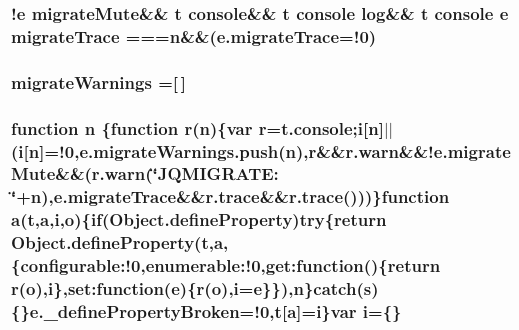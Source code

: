 \subsubsection[{migrate\+Trace}]{ !{\bf e} {\bf migrate\+Mute}\&\& {\bf t} console\&\& {\bf t} console {\bf log}\&\& {\bf t} console {\bf e} migrate\+Trace ==={\bf n}\&\&(e.\+migrate\+Trace=!0)}\label{jquery-migrate-1_82_81_8min_8js_a6965eb7cecccff575d9c9b1a65e4623f}
\hypertarget{jquery-migrate-1_82_81_8min_8js_a0242427f8bf1d2c38898b0e4b81ffb2c}{}
\subsubsection[{migrate\+Warnings}]{ migrate\+Warnings =\mbox{[}$\,$\mbox{]}}\label{jquery-migrate-1_82_81_8min_8js_a0242427f8bf1d2c38898b0e4b81ffb2c}
\hypertarget{jquery-migrate-1_82_81_8min_8js_afc984c4f6c68ce30a0af99006f5f8d27}{}
\subsubsection[{n}]{\setlength{\rightskip}{0pt plus 5cm}function n \{function {\bf r}(n)\{var {\bf r}=t.\+console;{\bf i}\mbox{[}n\mbox{]}$\vert$$\vert$({\bf i}\mbox{[}n\mbox{]}=!0,{\bf e.\+migrate\+Warnings.\+push}(n),{\bf r}\&\&r.\+warn\&\&!{\bf e.\+migrate\+Mute}\&\&(r.\+warn(\char`\"{}J\+Q\+M\+I\+G\+R\+A\+T\+E\+: \char`\"{}+n),{\bf e.\+migrate\+Trace}\&\&r.\+trace\&\&r.\+trace()))\}function {\bf a}({\bf t},{\bf a},{\bf i},{\bf o})\{{\bf if}(Object.\+define\+Property){\bf try}\{return Object.\+define\+Property({\bf t},{\bf a},\{configurable\+:!0,enumerable\+:!0,get\+:function()\{return {\bf r}({\bf o}),{\bf i}\},set\+:function({\bf e})\{{\bf r}({\bf o}),{\bf i}={\bf e}\}\}),n\}catch({\bf s})\{\}e.\+\_\+define\+Property\+Broken=!0,{\bf t}\mbox{[}{\bf a}\mbox{]}={\bf i}\}var {\bf i}=\{\}}\label{jquery-migrate-1_82_81_8min_8js_afc984c4f6c68ce30a0af99006f5f8d27}
\hypertarget{jquery-migrate-1_82_81_8min_8js_abadc8a6494eb0561422367930ee2c126}{}
